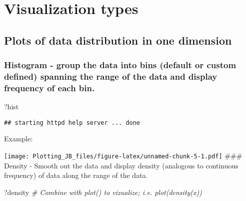 \documentclass[]{article}
\newenvironment{Shaded}{\begin{snugshade}}{\end{snugshade}}
\newcommand{\CommentTok}[1]{\textcolor[rgb]{0.56,0.35,0.01}{\textit{#1}}}
\newcommand{\KeywordTok}[1]{\textcolor[rgb]{0.13,0.29,0.53}{\textbf{#1}}}
\newcommand{\NormalTok}[1]{#1}
\newcommand{\OperatorTok}[1]{\textcolor[rgb]{0.81,0.36,0.00}{\textbf{#1}}}
\begin{document}
\hypertarget{visualization-types}{%
\section{Visualization types}\label{visualization-types}}

\hypertarget{plots-of-data-distribution-in-one-dimension}{%
\subsection{Plots of data distribution in one
dimension}\label{plots-of-data-distribution-in-one-dimension}}

\hypertarget{histogram---group-the-data-into-bins-default-or-custom-defined-spanning-the-range-of-the-data-and-display-frequency-of-each-bin.}{%
\subsubsection{Histogram - group the data into bins (default or custom
defined) spanning the range of the data and display frequency of each
bin.}\label{histogram---group-the-data-into-bins-default-or-custom-defined-spanning-the-range-of-the-data-and-display-frequency-of-each-bin.}}

\begin{Shaded}
\begin{Highlighting}[]
\NormalTok{?hist}
\end{Highlighting}
\end{Shaded}

\begin{verbatim}
## starting httpd help server ... done
\end{verbatim}

Example:

\begin{Shaded}
\end{Shaded}

\texttt{[image: Plotting\_JB\_files/figure-latex/unnamed-chunk-5-1.pdf]}
\#\#\# Density - Smooth out the data and display density (analogous to
continuous frequency) of data along the range of the data.

\begin{Shaded}
\begin{Highlighting}[]
\NormalTok{?density }\CommentTok{# Combine with plot() to vizualize; i.e. plot(density(x))}
\end{Highlighting}
\end{Shaded}
\end{document}
